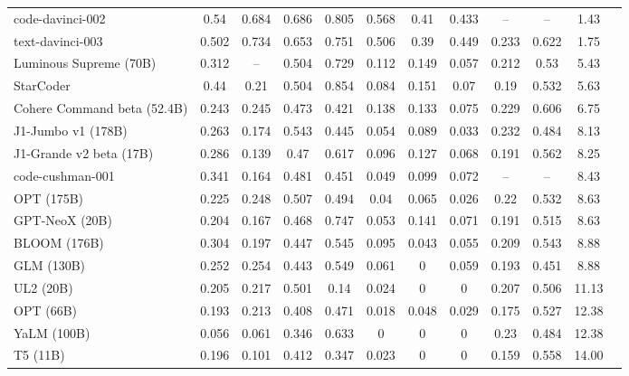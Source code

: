 \begin{table}
\begin{tabularx}{1.1\linewidth}{Xccccccccccc}
\cmidrule(r){1-1} \cmidrule(l){2-11}
code-davinci-002 &0.54 &0.684 &0.686 &0.805 &0.568 &0.41 &0.433 & -- & -- &1.43 \\
text-davinci-003 &0.502 &0.734 &0.653 &0.751 &0.506 &0.39 &0.449 &0.233 &0.622 &1.75 \\
Luminous Supreme (70B) &0.312 &-- &0.504 &0.729 &0.112 &0.149 &0.057 &0.212 &0.53 &5.43 \\
StarCoder &0.44 &0.21 &0.504 &0.854 &0.084 &0.151 &0.07 &0.19 &0.532 &5.63 \\
Cohere Command beta (52.4B) &0.243 &0.245 &0.473 &0.421 &0.138 &0.133 &0.075 &0.229 &0.606 &6.75 \\
J1-Jumbo v1 (178B) &0.263 &0.174 &0.543 &0.445 &0.054 &0.089 &0.033 &0.232 &0.484 &8.13 \\
J1-Grande v2 beta (17B) &0.286 &0.139 &0.47 &0.617 &0.096 &0.127 &0.068 &0.191 &0.562 &8.25 \\
code-cushman-001 &0.341 &0.164 &0.481 &0.451 &0.049 &0.099 &0.072 &-- &-- &8.43 \\
OPT (175B) &0.225 &0.248 &0.507 &0.494 &0.04 &0.065 &0.026 &0.22 &0.532 &8.63 \\
GPT-NeoX (20B) &0.204 &0.167 &0.468 &0.747 &0.053 &0.141 &0.071 &0.191 &0.515 &8.63 \\
BLOOM (176B) &0.304 &0.197 &0.447 &0.545 &0.095 &0.043 &0.055 &0.209 &0.543 &8.88 \\
GLM (130B) &0.252 &0.254 &0.443 &0.549 &0.061 &0 &0.059 &0.193 &0.451 &8.88 \\
UL2 (20B) &0.205 &0.217 &0.501 &0.14 &0.024 &0 &0 &0.207 &0.506 &11.13 \\
OPT (66B) &0.193 &0.213 &0.408 &0.471 &0.018 &0.048 &0.029 &0.175 &0.527 &12.38 \\
YaLM (100B) &0.056 &0.061 &0.346 &0.633 &0 &0 &0 &0.23 &0.484 &12.38 \\
T5 (11B) &0.196 &0.101 &0.412 &0.347 &0.023 &0 &0 &0.159 &0.558 &14.00 \\
\bottomrule
\end{tabularx}
\end{table}